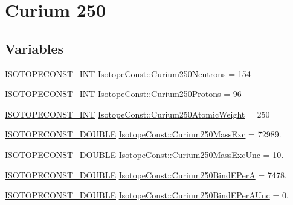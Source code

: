 \hypertarget{group___isotope_const-_curium-_cm250}{}\section{Curium 250}
\label{group___isotope_const-_curium-_cm250}
\subsection*{Variables}
\begin{DoxyCompactItemize}
\item 
\mbox{\hyperlink{group___isotope_const-_macros_ga5f18360b3e99483a35c32d789e62621c}{I\+S\+O\+T\+O\+P\+E\+C\+O\+N\+S\+T\+\_\+\+I\+NT}} \mbox{\hyperlink{group___isotope_const-_curium-_cm250_gacc213e00477ea090270423b98a597d23}{Isotope\+Const\+::\+Curium250\+Neutrons}} = 154
\item 
\mbox{\hyperlink{group___isotope_const-_macros_ga5f18360b3e99483a35c32d789e62621c}{I\+S\+O\+T\+O\+P\+E\+C\+O\+N\+S\+T\+\_\+\+I\+NT}} \mbox{\hyperlink{group___isotope_const-_curium-_cm250_gaa10cbb48c2ba8fabc271a3619db5f1a1}{Isotope\+Const\+::\+Curium250\+Protons}} = 96
\item 
\mbox{\hyperlink{group___isotope_const-_macros_ga5f18360b3e99483a35c32d789e62621c}{I\+S\+O\+T\+O\+P\+E\+C\+O\+N\+S\+T\+\_\+\+I\+NT}} \mbox{\hyperlink{group___isotope_const-_curium-_cm250_gaf8953893f700808dee5cf132a2ff5e28}{Isotope\+Const\+::\+Curium250\+Atomic\+Weight}} = 250
\item 
\mbox{\hyperlink{group___isotope_const-_macros_ga8f45a7272ce02c0b4c65c44636ed719a}{I\+S\+O\+T\+O\+P\+E\+C\+O\+N\+S\+T\+\_\+\+D\+O\+U\+B\+LE}} \mbox{\hyperlink{group___isotope_const-_curium-_cm250_ga81a9ff4fc6b74bf0fa895f272c733291}{Isotope\+Const\+::\+Curium250\+Mass\+Exc}} = 72989.
\item 
\mbox{\hyperlink{group___isotope_const-_macros_ga8f45a7272ce02c0b4c65c44636ed719a}{I\+S\+O\+T\+O\+P\+E\+C\+O\+N\+S\+T\+\_\+\+D\+O\+U\+B\+LE}} \mbox{\hyperlink{group___isotope_const-_curium-_cm250_ga3add2abf666a5abf90b5775b530b7dd1}{Isotope\+Const\+::\+Curium250\+Mass\+Exc\+Unc}} = 10.
\item 
\mbox{\hyperlink{group___isotope_const-_macros_ga8f45a7272ce02c0b4c65c44636ed719a}{I\+S\+O\+T\+O\+P\+E\+C\+O\+N\+S\+T\+\_\+\+D\+O\+U\+B\+LE}} \mbox{\hyperlink{group___isotope_const-_curium-_cm250_ga349eee1fcb5ab7ead66895273dc31655}{Isotope\+Const\+::\+Curium250\+Bind\+E\+PerA}} = 7478.
\item 
\mbox{\hyperlink{group___isotope_const-_macros_ga8f45a7272ce02c0b4c65c44636ed719a}{I\+S\+O\+T\+O\+P\+E\+C\+O\+N\+S\+T\+\_\+\+D\+O\+U\+B\+LE}} \mbox{\hyperlink{group___isotope_const-_curium-_cm250_gafda74e7e3f58a521e61c553b312f0cc1}{Isotope\+Const\+::\+Curium250\+Bind\+E\+Per\+A\+Unc}} = 0.

\end{DoxyCompactItemize}
